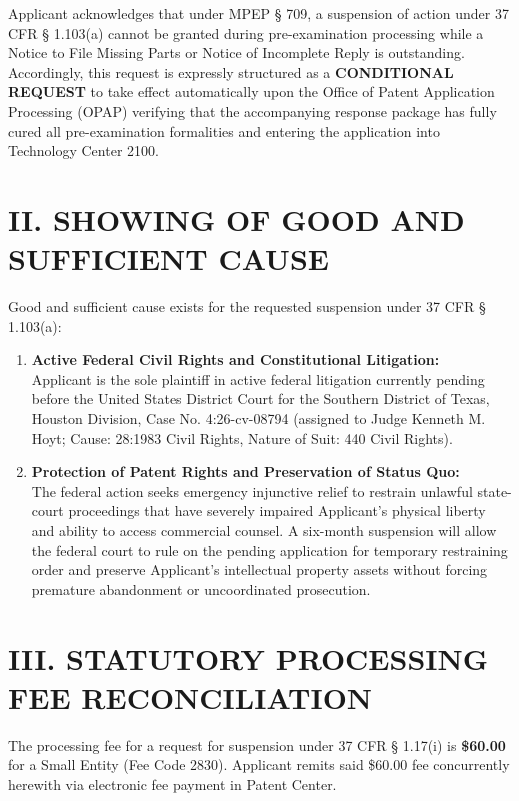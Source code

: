 \documentclass[11pt,letterpaper]{article}
\begin{document}
Applicant acknowledges that under MPEP \S{} 709, a suspension of action under 37 CFR \S{} 1.103(a) cannot be granted during pre-examination processing while a Notice to File Missing Parts or Notice of Incomplete Reply is outstanding. Accordingly, this request is expressly structured as a \textbf{CONDITIONAL REQUEST} to take effect automatically upon the Office of Patent Application Processing (OPAP) verifying that the accompanying response package has fully cured all pre-examination formalities and entering the application into Technology Center 2100.

\section*{II. SHOWING OF GOOD AND SUFFICIENT CAUSE}

Good and sufficient cause exists for the requested suspension under 37 CFR \S{} 1.103(a):
\begin{enumerate}[leftmargin=*]
    \item \textbf{Active Federal Civil Rights and Constitutional Litigation:} \\
    Applicant is the sole plaintiff in active federal litigation currently pending before the United States District Court for the Southern District of Texas, Houston Division, Case No. 4:26-cv-08794 (assigned to Judge Kenneth M. Hoyt; Cause: 28:1983 Civil Rights, Nature of Suit: 440 Civil Rights).

    \item \textbf{Protection of Patent Rights and Preservation of Status Quo:} \\
    The federal action seeks emergency injunctive relief to restrain unlawful state-court proceedings that have severely impaired Applicant's physical liberty and ability to access commercial counsel. A six-month suspension will allow the federal court to rule on the pending application for temporary restraining order and preserve Applicant's intellectual property assets without forcing premature abandonment or uncoordinated prosecution.
\end{enumerate}

\section*{III. STATUTORY PROCESSING FEE RECONCILIATION}

The processing fee for a request for suspension under 37 CFR \S{} 1.17(i) is \textbf{\$60.00} for a Small Entity (Fee Code 2830). Applicant remits said \$60.00 fee concurrently herewith via electronic fee payment in Patent Center.
\end{document}
